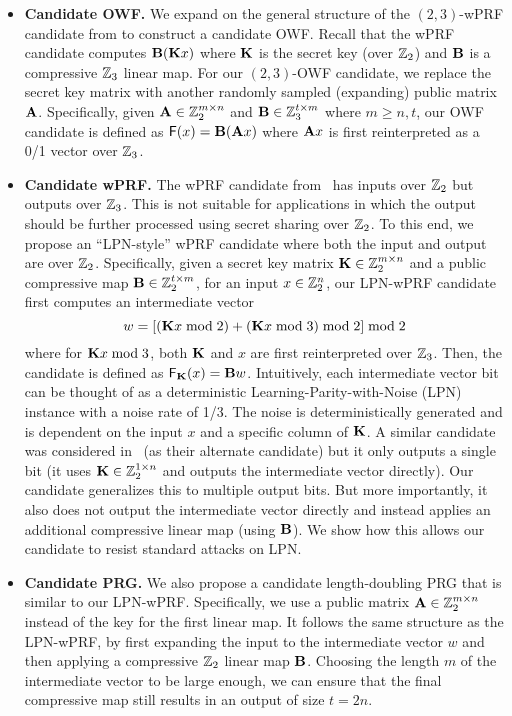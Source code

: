\begin{itemize}
    \item \textbf{Candidate OWF.}
    We expand on the general structure of the $(2,3)$-wPRF candidate from \cite{boneh2018-darkmatter} to construct a candidate OWF. Recall that the wPRF candidate computes $\mat{B}(\mat{K}x)$ where $\mat{K}$ is the secret key (over $\mathbb{Z}_2$) and $\mat{B}$ is a compressive $\mathbb{Z}_3$ linear map. For our $(2,3)$-OWF candidate, we replace the secret key matrix with another randomly sampled (expanding) public matrix $\mat{A}$. Specifically, given $\mat{A} \in \Z_2^{m \times n}$ and $\mat{B} \in \Z_3^{t \times m}$ where $m \geq n,t$, our OWF candidate is defined as $\mathsf{F}(x) = \mat{B}(\mat{A}x)$ where $\mat{A}x$ is first reinterpreted as a 0/1 vector over $\mathbb{Z}_3$.

    \item \textbf{Candidate wPRF.}
    The wPRF candidate from~\cite{boneh2018-darkmatter} has inputs over $\mathbb{Z}_2$ but outputs over $\mathbb{Z}_3$. This is not suitable for applications in which the output should be further processed using secret sharing over $\mathbb{Z}_2$. To this end, we propose an ``LPN-style'' wPRF candidate where both the input and output are over $\mathbb{Z}_2$. Specifically, given a secret key matrix $\mat{K} \in \Z_2^{m \times n}$ and a public compressive map $\mat{B} \in \Z_2^{t \times m}$, for an input $x \in \mathbb{Z}_2^n$, our LPN-wPRF candidate first computes an intermediate vector
    \[
        w = [(\mat{K}x \bmod 2) + (\mat{K}x \bmod 3) \bmod 2] \bmod 2
    \]
    where for $\mat{K}x \bmod 3$, both $\mat{K}$ and $x$ are first reinterpreted over $\mathbb{Z}_3$. Then, the candidate is defined as $\mathsf{F}_\mat{K}(x) = \mat{B}w$. Intuitively, each intermediate vector bit can be thought of as a deterministic Learning-Parity-with-Noise (LPN) instance with a noise rate of 1/3. The noise is deterministically generated and is dependent on the input $x$ and a specific column of $\mat{K}$. A similar candidate was considered in~\cite{boneh2018-darkmatter} (as their alternate candidate) but it only outputs a single bit (it uses $\mat{K} \in \Z_2^{1 \times n}$ and outputs the intermediate vector directly). Our candidate generalizes this to multiple output bits. But more importantly, it also does not output the intermediate vector directly and instead applies an additional compressive linear map (using $\mat{B}$). We show how this allows our candidate to resist standard attacks on LPN.


    \item \textbf{Candidate PRG.}
    We also propose a candidate length-doubling PRG that is similar to our LPN-wPRF. Specifically, we use a public matrix $\mat{A} \in \Z_2^{m \times n}$ instead of the key for the first linear map. It follows the same structure as the LPN-wPRF, by first expanding the input to the intermediate vector $w$ and then applying a compressive $\mathbb{Z}_2$ linear map $\mat{B}$. Choosing the length $m$ of the intermediate vector to be large enough, we can ensure that the final compressive map still results in an output of size $t = 2n$.


\end{itemize}

